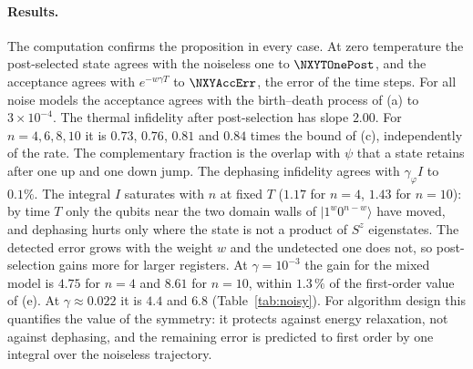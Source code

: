 \documentclass[11pt]{article}
\begin{document}
\paragraph{Results.} The computation confirms the proposition in every case. At zero temperature the post-selected
state agrees with the noiseless one to $\NXYTOnePost$, and the acceptance agrees with $e^{-w\gamma T}$ to
$\NXYAccErr$, the error of the time steps. For all noise models the acceptance agrees with the birth--death process of
(a) to $3\times10^{-4}$. The thermal infidelity after post-selection has slope $2.00$. For $n=4,6,8,10$ it is $0.73$,
$0.76$, $0.81$ and $0.84$ times the bound of (c), independently of the rate. The complementary fraction is the overlap
with $\psi$ that a state retains after one up and one down jump. The dephasing infidelity agrees with $\gamma_\varphi I$
to $0.1\%$. The integral $I$ saturates with $n$ at fixed $T$ ($1.17$ for $n=4$, $1.43$ for $n=10$): by time $T$ only
the qubits near the two domain walls of $|1^w0^{n-w}\rangle$ have moved, and dephasing hurts only where the state is not
a product of $S^z$ eigenstates. The detected error grows with the weight $w$ and the undetected one does not, so
post-selection gains more for larger registers. At $\gamma=10^{-3}$ the gain for the mixed model is $4.75$ for $n=4$ and
$8.61$ for $n=10$, within $1.3\,\%$ of the first-order value of (e). At $\gamma\approx0.022$ it is $4.4$ and $6.8$
(Table~\ref{tab:noisy}). For algorithm design this quantifies the value of the symmetry: it protects against energy
relaxation, not against dephasing, and the remaining error is predicted to first order by one integral over the
noiseless trajectory.
\end{document}
